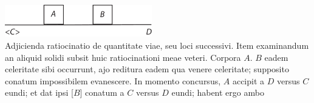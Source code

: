\pstart
\centering\includegraphics[trim = 0mm -1mm 0mm 0mm, clip, width=0.48\textwidth]{images/LH037,04_061v-d6.pdf}\\
\noindent
{}%
\pend
\vspace{1.5em}
\pstart
Adjicienda ratiocinatio de quantitate viae, seu loci successivi.
Item examinandum an aliquid solidi subsit huic ratiocinationi meae veteri.
Corpora $\displaystyle A$. $\displaystyle B$ eadem celeritate\protect{} sibi occurrunt,
ajo reditura eadem qua venere celeritate;
supposito conatum impossibilem\protect{} evanescere.
In momento concursus\protect{}, $\displaystyle A$ accipit
a $\displaystyle D$ versus $\displaystyle C$ eundi;
et dat ipsi [$\displaystyle B$]
conatum\protect{} a $\displaystyle C$ versus $\displaystyle D$ eundi;
habent ergo ambo
